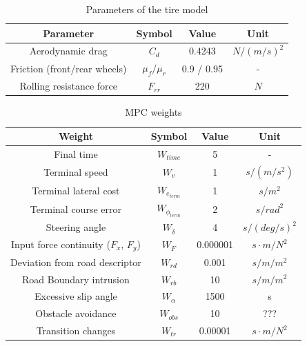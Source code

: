 \documentclass[a4paper, onecolumn, 12pt]{article}
\begin{document}
\begin{table}[H]
    \centering
    \caption{Parameters of the tire model} \label{env_params}
    \begin{tabular}{ |c|c|c|c| }
        \hline
        \textbf{Parameter} & \textbf{Symbol} & \textbf{Value} & \textbf{Unit} \\ [0.5ex] 
        \hline
        \hline 
        Aerodynamic drag & $C_d$ & 0.4243 & $N/(m/s)^2$ \\
        \hline
        Friction (front/rear wheels) & $\mu_f/\mu_r$ & 0.9 / 0.95 & - \\
        \hline
        Rolling resistance force & $F_{rr}$ & 220 & $N$ \\
        \hline

    \end{tabular}
\end{table}


\begin{table}[H] 
    \centering
    \caption{MPC weights} \label{weights}
    \begin{tabular}{ |c|c|c|c| }
        \hline
        \textbf{Weight} & \textbf{Symbol} & \textbf{Value} & \textbf{Unit} \\ [0.5ex] 
        \hline
        \hline
        Final time & $W_{time}$ & 5 & -\\ 
        \hline
        Terminal speed & $W_{v}$ & 1 & $s/(m/s^2)$\\
        \hline
        Terminal lateral cost & $W_{e_{term}}$ & 1 & $s/m^2$ \\
        \hline
        Terminal course error & $W_{\phi_{term}}$ & 2 & $s/rad^2$ \\
        \hline
        Steering angle & $W_{\dot{\delta}}$ & 4 & $s/(deg/s)^2$ \\
        \hline 
        Input force continuity ($F_x$, $F_y$) & $W_{F}$ & 0.000001 & $s \cdot m / N^2$ \\
        \hline
        Deviation from road descriptor & $W_{rd}$ & 0.001 & $s/m/m^2$ \\
        \hline
        Road Boundary intrusion & $W_{rb}$ & 10 & $s/m/m^2$ \\
        \hline
        Excessive slip angle & $W_\alpha$ & 1500 & s \\
        \hline
        Obstacle avoidance & $W_{obs}$ & 10 & ??? \\
        \hline
        Transition changes & $W_{tr}$ & 0.00001 & $s \cdot m / N^2$ \\
        \hline
    \end{tabular}
\end{table}
\end{document}
